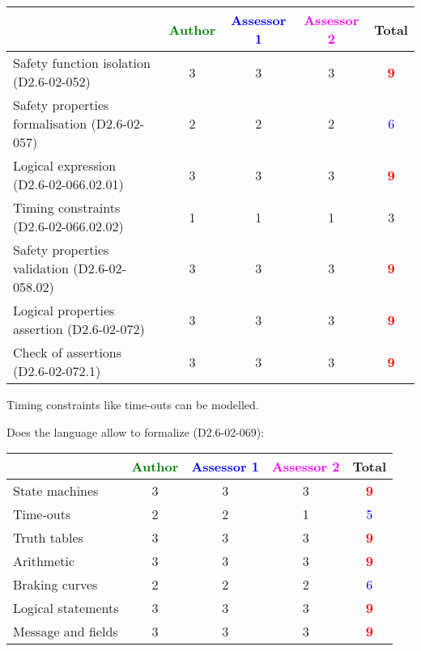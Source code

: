 \begin{tabular}{|l | c | c | c | c|}
\hline
& \textcolor{green}{Author} & \textcolor{blue}{Assessor 1} & \textcolor{magenta}{Assessor 2} & Total \\
\hline 
Safety function isolation (D2.6-02-052)  & 3     & 3     & 3     & \textcolor{red}{\textbf{9}} \\
\hline 
Safety properties formalisation (D2.6-02-057)  & 2     & 2     & 2     & \textcolor{blue}{6} \\
\hline
Logical expression (D2.6-02-066.02.01)  & 3     & 3     & 3     & \textcolor{red}{\textbf{9}} \\
\hline
Timing constraints (D2.6-02-066.02.02)  & 1     & 1     & 1     & 3     \\
\hline
Safety properties validation (D2.6-02-058.02)  & 3     & 3     & 3     & \textcolor{red}{\textbf{9}} \\
\hline
Logical properties assertion (D2.6-02-072)  &  3 & 3     & 3     & \textcolor{red}{\textbf{9}} \\
\hline
Check  of assertions (D2.6-02-072.1)  & 3     & 3     & 3     & \textcolor{red}{\textbf{9}} \\
\hline
\end{tabular}


\begin{author_comment}
Timing constraints like time-outs can be modelled.
\end{author_comment}


Does the language allow to  formalize (D2.6-02-069):

\begin{tabular}{|l | c | c | c | c|}
\hline
& \textcolor{green}{Author} & \textcolor{blue}{Assessor 1} & \textcolor{magenta}{Assessor 2} & Total \\
\hline 
State machines  & 3     & 3     & 3     & \textcolor{red}{\textbf{9}} \\
\hline
Time-outs  & 2     & 2     & 1     & \textcolor{blue}{5}  \\
\hline
Truth tables  & 3     & 3     & 3     & \textcolor{red}{\textbf{9}} \\
\hline
Arithmetic  & 3     & 3     & 3     & \textcolor{red}{\textbf{9}} \\
\hline
Braking curves  & 2     & 2     & 2     & \textcolor{blue}{6} \\
\hline
Logical statements & 3     & 3     & 3     & \textcolor{red}{\textbf{9}} \\
\hline
Message and fields & 3     & 3     & 3     & \textcolor{red}{\textbf{9}} \\
\hline
\end{tabular}


